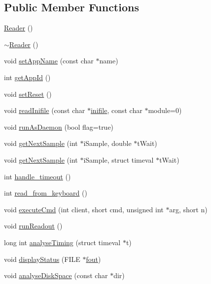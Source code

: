 \subsection*{Public Member Functions}
\begin{DoxyCompactItemize}
\item 
\hyperlink{classReader_adcda31b507720ab44044d7a21686fba2}{Reader} ()
\item 
\hyperlink{classReader_a78089542fd27a0ac2df6702fffe8725c}{$\sim$\-Reader} ()
\item 
void \hyperlink{classReader_a00b096fb45b4c2510f8b045989bf162c}{set\-App\-Name} (const char $\ast$name)
\item 
int \hyperlink{classReader_ae309d831a357a1107a7f7f1db49f00e8}{get\-App\-Id} ()
\item 
void \hyperlink{classReader_aadf658dbddd5060d8a2f10482f070a16}{set\-Reset} ()
\item 
void \hyperlink{classReader_a0f1f72184f82854b67b28471844734da}{read\-Inifile} (const char $\ast$\hyperlink{classReader_aaeaf0ff38217063a14b00bf16deed50a}{inifile}, const char $\ast$module=0)
\item 
void \hyperlink{classReader_a4f2113dc609befa174f3716492bf7ebc}{run\-As\-Daemon} (bool flag=true)
\item 
void \hyperlink{classReader_aa471d16ce98f57c1c40aaf6090a3a971}{get\-Next\-Sample} (int $\ast$i\-Sample, double $\ast$t\-Wait)
\item 
void \hyperlink{classReader_a656b1bef6050e0b043f4499fe2a22f2d}{get\-Next\-Sample} (int $\ast$i\-Sample, struct timeval $\ast$t\-Wait)
\item 
int \hyperlink{classReader_a1c23cb1e3ec1a87fb5db65392fb43d21}{handle\-\_\-timeout} ()
\item 
int \hyperlink{classReader_a8adf1a4f5f852efa0433cab70bb750c0}{read\-\_\-from\-\_\-keyboard} ()
\item 
void \hyperlink{classReader_a8d71e1068d9bf3886ac4fd472ed71ae9}{execute\-Cmd} (int client, short cmd, unsigned int $\ast$arg, short n)
\item 
void \hyperlink{classReader_a966aeba64f6a646c10276d248b60760c}{run\-Readout} ()
\item 
long int \hyperlink{classReader_a1abd8f689645dafbf76fda50cd9dd48d}{analyse\-Timing} (struct timeval $\ast$t)
\item 
void \hyperlink{classReader_a73c6e0134bdd06ebdbfef68252b8be94}{display\-Status} (F\-I\-L\-E $\ast$\hyperlink{classBaseServer_a9ad43261a042fbeeafee33ca4c0b3fd3}{fout})
\item 
void \hyperlink{classReader_a330c1515ec85cdde0662805cd3be735e}{analyse\-Disk\-Space} (const char $\ast$dir)
\end{DoxyCompactItemize}
